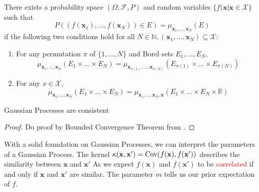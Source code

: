 \begin{theorem}
    
    There exists a probability space $(\Omega, \mathcal{F}, P)$ and random variables $\{ f(\mathbf{x} | \mathbf{x} \in \mathcal{X} \}$ such that
    \begin{equation*}
        P((f(\mathbf{x}_1), \dots, f(\mathbf{x}_N)) \in E) = \mu_{\mathbf{x}_1, \dots, \mathbf{x}_N}(E)
    \end{equation*}
    if the following two conditions hold for all $N \in \mathbb{N}, (\mathbf{x}_1, \dots, \mathbf{x}_N) \subseteq \mathcal{X}$:
    \begin{enumerate}
        \item For any permutation $\pi$ of $\{ 1, \dots, N \}$ and Borel sets $E_1, \dots, E_N$,
            \begin{equation*}
                \mu_{\mathbf{x}_1, \dots, \mathbf{x}_N}(E_1 \times \dots \times E_N)
                =\mu_{\mathbf{x}_{\pi(1)}, \dots, \mathbf{x}_{\pi(N)}}\left(E_{\pi(1)} \times \dots \times E_{\pi(N)}\right)
            \end{equation*}
        \item For any $x \in \mathcal{X}$,
            \begin{equation*}
                \mu_{\mathbf{x}_1, \dots, \mathbf{x}_N}(E_1 \times \dots \times E_N)
                =
                \mu_{\mathbf{x}_1, \dots, \mathbf{x}_N, \mathbf{x}}(E_1 \times \dots \times E_N \times \mathbb{R})
            \end{equation*}
    \end{enumerate}
\end{theorem}

\begin{theorem}\label{thm:gp-const}
    Gaussian Processes are consistent
\end{theorem}
\begin{proof}
    Do proof by Bounded Convergence Theorem from \cite{axler2020}.
\end{proof}

With a solid foundation on Gaussian Processes, we can interpret the parameters of a Gaussian Process.
The kernel $\kappa(\mathbf{x}, \mathbf{x}') = \operatorname{Cov}(f(\mathbf{x}), f(\mathbf{x}'))$ describes the similarity between $\mathbf{x}$ and $\mathbf{x}'$
As we expect $f(\mathbf{x})$ and $f(\mathbf{x}')$ to be \textcolor{red}{correlated} if and only if $\mathbf{x}$ and $\mathbf{x}'$ are similar.
The parameter $m$ tells us our prior expectation of $f$.

